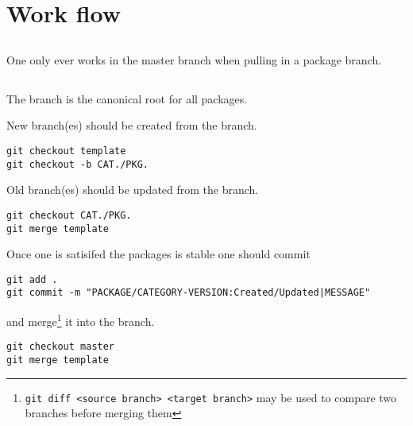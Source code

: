 \documentclass{article}
\begin{document}

\section{Work flow}

\subsection{}

One only ever works in the master branch when pulling in a package branch.

\subsection{}

The  branch is the canonical root for all packages. 

\vspace{0.75ex}
\noindent
\begin{minipage}{0.48\textwidth}
New  branch(es) should be created from the  branch.
\begin{lstlisting}[basicstyle=\small]
git checkout template
git checkout -b CAT./PKG.
\end{lstlisting}
\end{minipage}
\hfill\hfill
\begin{minipage}{0.48\textwidth}
Old  branch(es) should be updated from the  branch.
\begin{lstlisting}[basicstyle=\small]
git checkout CAT./PKG.
git merge template
\end{lstlisting}
\end{minipage}
\noindent
Once one is satisifed the packages is stable one should commit
\begin{lstlisting}
git add .
git commit -m "PACKAGE/CATEGORY-VERSION:Created/Updated|MESSAGE"
\end{lstlisting}
and merge\footnote{\lstinline|git diff <source branch> <target branch>| may be used to compare two branches before merging them} it into the  branch.
\begin{lstlisting}
git checkout master
git merge template
\end{lstlisting}
\end{document}
